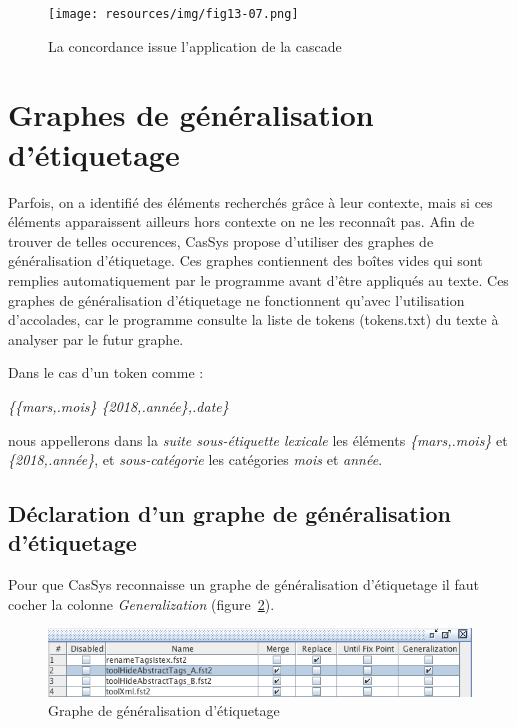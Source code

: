 \begin{figure}[!htb]
  \centering
  \texttt{[image: resources/img/fig13-07.png]}
  \caption{La concordance issue l'application de la cascade}
  \label{fig13-07}
\end{figure}

\section{Graphes de g\'{e}n\'{e}ralisation d'\'{e}tiquetage}
\label{section:graphe_generalisation}

Parfois, on a identifi\'{e} des \'{e}l\'{e}ments recherch\'{e}s gr\^{a}ce \`{a} leur contexte, mais si ces \'{e}l\'{e}ments apparaissent ailleurs hors contexte on ne les reconna\^{i}t pas. Afin de trouver de telles occurences, CasSys propose d'utiliser des graphes de g\'{e}n\'{e}ralisation d'\'{e}tiquetage. Ces graphes contiennent des bo\^{i}tes vides qui sont remplies automatiquement par le programme avant d'\^{e}tre appliqu\'{e}s au texte. Ces graphes de g\'{e}n\'{e}ralisation d'\'{e}tiquetage ne fonctionnent qu'avec l'utilisation d'accolades, car le programme consulte la liste de tokens (tokens.txt) du texte \`{a} analyser par le futur graphe.

Dans le cas d'un token comme :

\emph{\{\{mars,.mois\} \{2018,.année\},.date\}}

nous appellerons dans la \emph{suite sous-étiquette lexicale} les éléments \emph{\{mars,.mois\}} et \emph{\{2018,.année\}}, et \emph{sous-catégorie} les catégories \textit{mois} et \textit{année}.

\subsection{D\'{e}claration d'un graphe de g\'{e}n\'{e}ralisation d'\'{e}tiquetage}
Pour que CasSys reconnaisse un graphe de g\'{e}n\'{e}ralisation d'\'{e}tiquetage il faut cocher la colonne \emph{Generalization} (figure~\ref{fig12-3}).
\begin{figure}[!htb]
  \centering
  \includegraphics[width=15cm]{resources/img/fig12-3.png}
  \caption{Graphe de g\'{e}n\'{e}ralisation d'\'{e}tiquetage}
  \label{fig12-3}
\end{figure}

